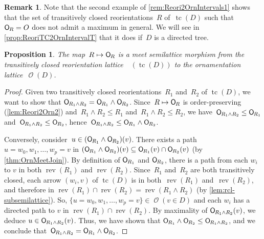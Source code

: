 \documentclass{amsart}
\newtheorem{proposition}[theorem]{Proposition}
\theoremstyle{definition}
\newtheorem{remark}[theorem]{Remark}
\renewcommand{\c}[1]{\mathcal{#1}} %
\DeclareMathOperator{\tc}{tc} %
\newcommand{\Vincent}[1]{\todo[size=\tiny,color=blue!30]{ #1 \\ \hfill --- V.}\,}
\newcommand{\meet}{\wedge} %
\newcommand{\mymap}[2]{\mathsf{#1}_{\hspace{-.7pt}#2}}
\DeclareMathOperator{\Orn}{\c{O}}  %
\newcommand{\orn}[1]{\mymap{O}{#1}}  %
\DeclareMathOperator{\Rcl}{\c{R}^{cl}}  %
\DeclareMathOperator{\rev}{rev} %
\begin{document}
\begin{remark}
\label{rem:Reori2OrnIntervals2}
Note that the second example of \cref{rem:Reori2OrnIntervals1} shows that the set of transitively closed reorientations~$R$ of~$\tc(D)$ such that~$\orn{R} = O$ does not admit a maximum in general.
We will see in \cref{prop:ReoriTC2OrnIntervalT} that it does if~$D$ is a directed tree.
\end{remark}

\begin{proposition}
\label{prop:Reori2OrnMeetSemilaticeTC}
The map~$R \mapsto \orn{R}$ is a meet semilattice morphism from the transitively closed reorientation lattice~$\Rcl(\tc(D))$ to the ornamentation lattice~$\Orn(D)$.
\end{proposition}

\begin{proof}
Given two transitively closed reorientations~$R_1$ and~$R_2$ of $\tc(D)$, we want to show that $\orn{R_1 \meet R_2} = \orn{R_1} \meet \orn{R_2}$.
Since~$R \mapsto \orn{R}$ is order-preserving (\cref{lem:Reori2Orn2}) and~$R_1 \meet R_2 \le R_1$ and~$R_1 \meet R_2 \le R_2$, we have~$\orn{R_1 \meet R_2} \le \orn{R_1}$ and~$\orn{R_1 \meet R_2} \le \orn{R_2}$, hence~$\orn{R_1 \meet R_2} \le \orn{R_1} \meet \orn{R_2}$.

Conversely, consider~$u \in (\orn{R_1} \meet \orn{R_2})(v)$.
There exists a path~$u = w_0, w_1, \dots, w_p = v$ in $(\orn{R_1} \meet \orn{R_2})(v) \subseteq \orn{R_1}(v) \cap \orn{R_2}(v)$ (by \cref{thm:OrnMeetJoin}).
By definition of $\orn{R_1}$ and $\orn{R_2}$, there is a path from each $w_i$ to $v$ in both $\rev(R_1)$ and $\rev(R_2)$.
Since~$R_1$ and~$R_2$ are both transitively closed, each arrow $(w_i,v)$ of $\tc(D)$ is in both~$\rev(R_1)$ and~$\rev(R_2)$,
and therefore in $\rev(R_1) \cap \rev(R_2) = \rev(R_1 \meet R_2)$ (by \cref{lem:rcl-subsemilattice}).
So, $\{u = w_0, w_1, \dots, w_p = v\} \in \Orn(v \in D)$ and each $w_i$ has a directed path to $v$ in $\rev(R_1) \cap \rev(R_2)$.
By maximality of $\orn{R_1 \meet R_2}(v)$, we deduce $u \in \orn{R_1 \meet R_2}(v)$.
Thus, we have shown that $\orn{R_1} \meet \orn{R_2} \le \orn{R_1 \meet R_2}$, and we conclude that~$\orn{R_1 \meet R_2} = \orn{R_1} \meet \orn{R_2}$.
%
\end{proof}
\end{document}
